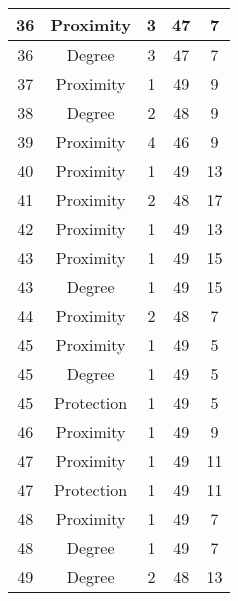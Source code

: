 \documentclass[results.tex]{subfiles}
\begin{document}
\begin{center}
\begin{tabular}{| c || c | c | c | c |}
    36 & Proximity & 3 & 47 & 7 \\ 
    \hline
    36 & Degree & 3 & 47 & 7 \\ 
    \hline
    37 & Proximity & 1 & 49 & 9 \\ 
    \hline
    38 & Degree & 2 & 48 & 9 \\ 
    \hline
    39 & Proximity & 4 & 46 & 9 \\ 
    \hline
    40 & Proximity & 1 & 49 & 13 \\ 
    \hline
    41 & Proximity & 2 & 48 & 17 \\ 
    \hline
    42 & Proximity & 1 & 49 & 13 \\ 
    \hline
    43 & Proximity & 1 & 49 & 15 \\ 
    \hline
    43 & Degree & 1 & 49 & 15 \\ 
    \hline
    44 & Proximity & 2 & 48 & 7 \\ 
    \hline
    45 & Proximity & 1 & 49 & 5 \\ 
    \hline
    45 & Degree & 1 & 49 & 5 \\ 
    \hline
    45 & Protection & 1 & 49 & 5 \\ 
    \hline
    46 & Proximity & 1 & 49 & 9 \\ 
    \hline
    47 & Proximity & 1 & 49 & 11 \\ 
    \hline
    47 & Protection & 1 & 49 & 11 \\ 
    \hline
    48 & Proximity & 1 & 49 & 7 \\ 
    \hline
    48 & Degree & 1 & 49 & 7 \\ 
    \hline
    49 & Degree & 2 & 48 & 13 \\ 
    \hline   \end{tabular}
\end{center}
\end{document}
